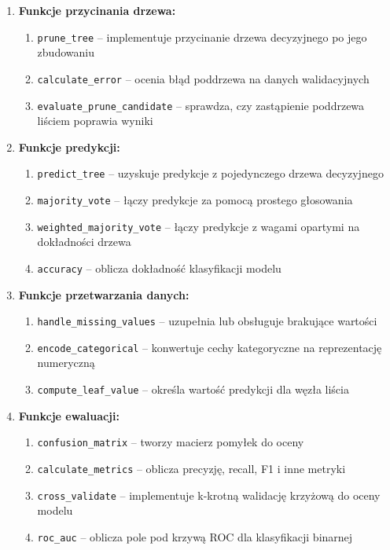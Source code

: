 \documentclass[12pt,a4paper]{article}
\begin{document}
\begin{enumerate}
    \item \textbf{Funkcje przycinania drzewa:}
    \begin{enumerate}
        \item \texttt{prune\_tree} -- implementuje przycinanie drzewa decyzyjnego po jego zbudowaniu
        \item \texttt{calculate\_error} -- ocenia błąd poddrzewa na danych walidacyjnych
        \item \texttt{evaluate\_prune\_candidate} -- sprawdza, czy zastąpienie poddrzewa liściem poprawia wyniki
    \end{enumerate}

    \item \textbf{Funkcje predykcji:}
    \begin{enumerate}
        \item \texttt{predict\_tree} -- uzyskuje predykcje z pojedynczego drzewa decyzyjnego
        \item \texttt{majority\_vote} -- łączy predykcje za pomocą prostego głosowania
        \item \texttt{weighted\_majority\_vote} -- łączy predykcje z wagami opartymi na dokładności drzewa
        \item \texttt{accuracy} -- oblicza dokładność klasyfikacji modelu
    \end{enumerate}

    \item \textbf{Funkcje przetwarzania danych:}
    \begin{enumerate}
        \item \texttt{handle\_missing\_values} -- uzupełnia lub obsługuje brakujące wartości
        \item \texttt{encode\_categorical} -- konwertuje cechy kategoryczne na reprezentację numeryczną
        \item \texttt{compute\_leaf\_value} -- określa wartość predykcji dla węzła liścia
    \end{enumerate}

    \item \textbf{Funkcje ewaluacji:}
    \begin{enumerate}
        \item \texttt{confusion\_matrix} -- tworzy macierz pomyłek do oceny
        \item \texttt{calculate\_metrics} -- oblicza precyzję, recall, F1 i inne metryki
        \item \texttt{cross\_validate} -- implementuje k-krotną walidację krzyżową do oceny modelu
        \item \texttt{roc\_auc} -- oblicza pole pod krzywą ROC dla klasyfikacji binarnej
    \end{enumerate}


\end{enumerate}
\end{document}
